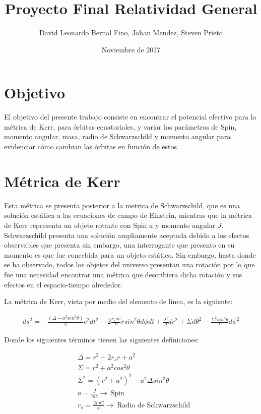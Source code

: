 \documentclass{article}
\title{Proyecto Final Relatividad General}
\author{David Leonardo Bernal Fino, Johan Mendez, Steven Prieto}
\date{Noviembre de 2017}
\begin{document}
\maketitle

\section{Objetivo}

El objetivo del presente trabajo consiste en encontrar el potencial efectivo para la métrica de Kerr, para órbitas ecuatoriales, y variar los parámetros de Spin, momento angular, masa, radio de Schwarzschild y momento angular para evidenciar cómo cambian las órbitas en función de éstos. 

\section{Métrica de Kerr}

Esta métrica se presenta posterior a la metrica de Schwarzschild, que es una solución estática a las ecuaciones de campo de Einstein, mientras que la métrica de Kerr representa un objeto rotante con Spin $a$ y momento angular $J$. Schwarzschild presenta una solución ampliamente aceptada debido a los efectos observables que presenta sin embargo, una interrogante que presento en su momento es que fue concebida para un objeto estático. Sin embargo, hasta donde se ha observado, todos los objetos del universo presentan una rotación por lo que fue una necesidad encontrar una métrica que describiera dicha rotación y sus efectos en el espacio-tiempo alrededor.

\medskip

La métrica de Kerr, vista por medio del elemento de línea, es la siguiente:

\begin{align*}
    ds^2=-\frac{(\Delta-a^2sen^2\theta)}{\Sigma}c^2dt^2-2\frac{r_sac}{\Sigma}rsin^2\theta d\phi dt +\frac{\Sigma}{\Delta}dr^2+\Sigma d\theta^2-\frac{\Sigma^2 sin^2\theta}{\Sigma}d\phi^2
\end{align*}

Donde los siguientes términos tienen las siguientes definiciones:

\begin{align*}
    &\Delta=r^2-2r_sr+a^2\\
    &\Sigma=r^2+a^2cos^2\theta\\
    &\Sigma^2=(r^2+a^2)^2-a^2\Delta sin^2\theta\\
    &a=\frac{J}{mc} \longrightarrow \ \text{Spin}\\
    &r_s=\frac{2mG}{c^2} \longrightarrow \ \text{Radio de Schwarzschild}
\end{align*}
\end{document}
